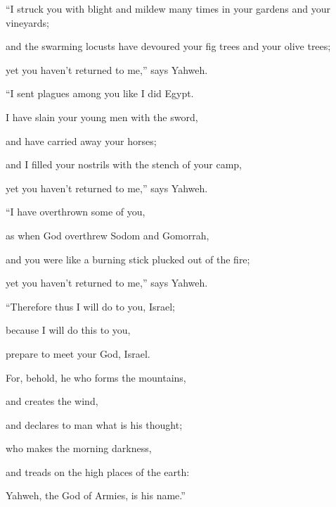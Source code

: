 {\par }{\Q {}“I struck you with blight and mildew many times in your gardens and your vineyards;
\par }{\QB and the swarming locusts have devoured your fig trees and your olive trees;
\par }{\QB yet you haven’t returned to me,” says Yahweh.
\par }{\Q {}“I sent plagues among you like I did Egypt.
\par }{\QB I have slain your young men with the sword,
\par }{\QB and have carried away your horses;
\par }{\QB and I filled your nostrils with the stench of your camp,
\par }{\QB yet you haven’t returned to me,” says Yahweh.
\par }{\Q {}“I have overthrown some of you,
\par }{\QB as when God overthrew Sodom and Gomorrah,
\par }{\QB and you were like a burning stick plucked out of the fire;
\par }{\QB yet you haven’t returned to me,” says Yahweh.
\par }{\Q {}“Therefore thus I will do to you, Israel;
\par }{\QB because I will do this to you,
\par }{\QB prepare to meet your God, Israel.
\par }{\Q {}For, behold, he who forms the mountains,
\par }{\QB and creates the wind,
\par }{\QB and declares to man what is his thought;
\par }{\QB who makes the morning darkness,
\par }{\QB and treads on the high places of the earth:
\par }{\QB Yahweh, the God of Armies, is his name.”

}
